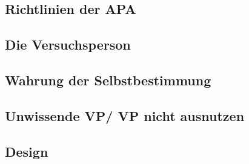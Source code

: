 \documentclass[10pt]{beamer}
\begin{document}
\subsection{Richtlinien der APA}
%
\subsection{Die Versuchsperson}
\subsection{Wahrung der Selbstbestimmung}

\subsection{Unwissende VP/ VP nicht ausnutzen}

\subsection{Design}
\end{document}
